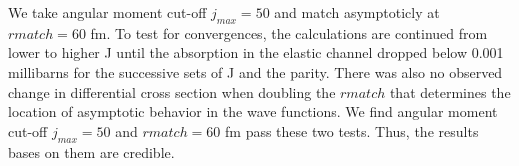 	We take angular moment cut-off $j_{max} = 50 $ and match asymptoticly at $rmatch = 60 $ fm.
	To test for convergences, the calculations are continued from lower to higher J until the absorption in the elastic channel dropped below 0.001 millibarns for the successive sets of J and the parity.  
	There was also no observed change in differential cross section when doubling the $rmatch$ that determines the location of asymptotic behavior in the wave functions.
	We find angular moment cut-off $j_{max} = 50 $ and  $rmatch = 60 $ fm pass these two tests.
	Thus, the results bases on them are credible.
	
